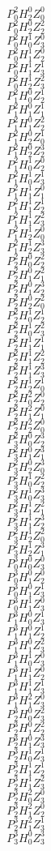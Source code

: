 \documentclass{article}
\begin{document}
\begin{multicols}{6}
\[ P^{2}_{0}  H^{0}_{2}  Z^{0}_{0}\]
\[ P^{2}_{0}  H^{0}_{2}  Z^{2}_{2}\]
\[ P^{2}_{0}  H^{1}_{0}  Z^{0}_{3}\]
\[ P^{2}_{0}  H^{1}_{1}  Z^{0}_{2}\]
\[ P^{2}_{0}  H^{1}_{1}  Z^{1}_{3}\]
\[ P^{2}_{0}  H^{1}_{2}  Z^{2}_{3}\]
\[ P^{2}_{1}  H^{0}_{0}  Z^{1}_{2}\]
\[ P^{2}_{1}  H^{0}_{1}  Z^{1}_{1}\]
\[ P^{2}_{1}  H^{0}_{1}  Z^{2}_{2}\]
\[ P^{2}_{1}  H^{0}_{2}  Z^{1}_{0}\]
\[ P^{2}_{1}  H^{0}_{2}  Z^{3}_{2}\]
\[ P^{2}_{1}  H^{1}_{0}  Z^{0}_{2}\]
\[ P^{2}_{1}  H^{1}_{0}  Z^{1}_{3}\]
\[ P^{2}_{1}  H^{1}_{1}  Z^{0}_{1}\]
\[ P^{2}_{1}  H^{1}_{1}  Z^{1}_{2}\]
\[ P^{2}_{1}  H^{1}_{1}  Z^{2}_{3}\]
\[ P^{2}_{1}  H^{1}_{2}  Z^{0}_{0}\]
\[ P^{2}_{1}  H^{1}_{2}  Z^{3}_{3}\]
\[ P^{2}_{2}  H^{0}_{0}  Z^{2}_{2}\]
\[ P^{2}_{2}  H^{0}_{1}  Z^{2}_{1}\]
\[ P^{2}_{2}  H^{0}_{1}  Z^{3}_{2}\]
\[ P^{2}_{2}  H^{0}_{2}  Z^{2}_{0}\]
\[ P^{2}_{2}  H^{1}_{0}  Z^{1}_{2}\]
\[ P^{2}_{2}  H^{1}_{0}  Z^{2}_{3}\]
\[ P^{2}_{2}  H^{1}_{1}  Z^{1}_{1}\]
\[ P^{2}_{2}  H^{1}_{1}  Z^{2}_{2}\]
\[ P^{2}_{2}  H^{1}_{1}  Z^{3}_{3}\]
\[ P^{2}_{2}  H^{1}_{2}  Z^{1}_{0}\]
\[ P^{2}_{2}  H^{2}_{0}  Z^{0}_{2}\]
\[ P^{2}_{2}  H^{2}_{1}  Z^{0}_{1}\]
\[ P^{2}_{2}  H^{2}_{2}  Z^{0}_{0}\]
\[ P^{2}_{3}  H^{0}_{0}  Z^{3}_{2}\]
\[ P^{2}_{3}  H^{0}_{1}  Z^{3}_{1}\]
\[ P^{2}_{3}  H^{0}_{2}  Z^{3}_{0}\]
\[ P^{2}_{3}  H^{1}_{0}  Z^{2}_{2}\]
\[ P^{2}_{3}  H^{1}_{0}  Z^{3}_{3}\]
\[ P^{2}_{3}  H^{1}_{1}  Z^{2}_{1}\]
\[ P^{2}_{3}  H^{1}_{1}  Z^{3}_{2}\]
\[ P^{2}_{3}  H^{1}_{2}  Z^{2}_{0}\]
\[ P^{2}_{3}  H^{1}_{2}  Z^{3}_{1}\]
\[ P^{3}_{0}  H^{0}_{0}  Z^{0}_{3}\]
\[ P^{3}_{0}  H^{0}_{1}  Z^{0}_{2}\]
\[ P^{3}_{0}  H^{0}_{1}  Z^{1}_{3}\]
\[ P^{3}_{0}  H^{1}_{1}  Z^{0}_{3}\]
\[ P^{3}_{1}  H^{0}_{0}  Z^{1}_{3}\]
\[ P^{3}_{1}  H^{0}_{1}  Z^{1}_{2}\]
\[ P^{3}_{1}  H^{0}_{1}  Z^{2}_{3}\]
\[ P^{3}_{1}  H^{1}_{0}  Z^{0}_{3}\]
\[ P^{3}_{1}  H^{1}_{1}  Z^{0}_{2}\]
\[ P^{3}_{1}  H^{1}_{1}  Z^{1}_{3}\]
\[ P^{3}_{1}  H^{2}_{1}  Z^{0}_{3}\]
\[ P^{3}_{2}  H^{0}_{0}  Z^{2}_{3}\]
\[ P^{3}_{2}  H^{0}_{1}  Z^{2}_{2}\]
\[ P^{3}_{2}  H^{0}_{1}  Z^{3}_{3}\]
\[ P^{3}_{2}  H^{1}_{0}  Z^{1}_{3}\]
\[ P^{3}_{2}  H^{1}_{1}  Z^{1}_{2}\]
\[ P^{3}_{2}  H^{1}_{1}  Z^{2}_{3}\]
\[ P^{3}_{2}  H^{2}_{0}  Z^{0}_{3}\]
\[ P^{3}_{2}  H^{2}_{1}  Z^{0}_{2}\]
\[ P^{3}_{2}  H^{2}_{1}  Z^{1}_{3}\]
\[ P^{3}_{3}  H^{0}_{0}  Z^{3}_{3}\]
\end{multicols}
\end{document}
